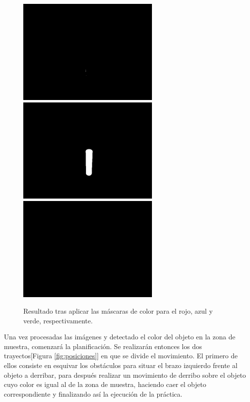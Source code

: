 \documentclass[12pt,spanish,chapterprefix, numbers=noenddot]{book}
\numberwithin{equation}{section}
\numberwithin{figure}{section}
\begin{document}
\begin{figure}[hbt!]
\centering
\includegraphics[width=7cm]{Figs/red_mask.jpeg}
\includegraphics[width=7cm]{Figs/blue_mask.jpeg}
\includegraphics[width=7cm]{Figs/green_mask.jpeg}
\par
\caption{\label{fig:mascaras}Resultado tras aplicar las máscaras de color para el rojo, azul y verde, respectivamente. }
\end{figure}

Una vez procesadas las imágenes y detectado el color del objeto en la zona de muestra, comenzará la planificación. Se realizarán entonces los dos trayectos[Figura \ref{fig:posiciones}] en que se divide el movimiento. El primero de ellos consiste en esquivar los obstáculos para situar el brazo izquierdo frente al objeto a derribar, para después realizar un movimiento de derribo sobre el objeto cuyo color es igual al de la zona de muestra, haciendo caer el objeto correspondiente y finalizando así la ejecución de la práctica. 
\end{document}
